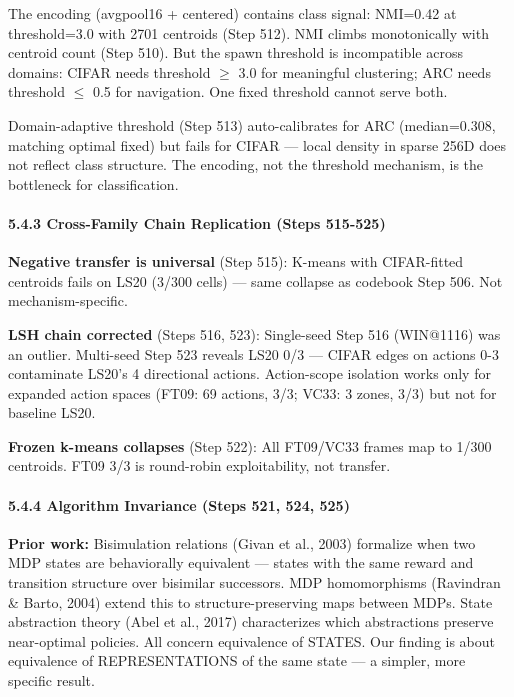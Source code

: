 \documentclass[
  11pt,
]{article}
\begin{document}
The encoding (avgpool16 + centered) contains class signal: NMI=0.42 at
threshold=3.0 with 2701 centroids (Step 512). NMI climbs monotonically
with centroid count (Step 510). But the spawn threshold is incompatible
across domains: CIFAR needs threshold \(\geq\) 3.0 for meaningful
clustering; ARC needs threshold \(\leq\) 0.5 for navigation. One fixed
threshold cannot serve both.

Domain-adaptive threshold (Step 513) auto-calibrates for ARC
(median=0.308, matching optimal fixed) but fails for CIFAR --- local
density in sparse 256D does not reflect class structure. The encoding,
not the threshold mechanism, is the bottleneck for classification.

\paragraph{5.4.3 Cross-Family Chain Replication (Steps
515-525)}\label{cross-family-chain-replication-steps-515-525}

\textbf{Negative transfer is universal} (Step 515): K-means with
CIFAR-fitted centroids fails on LS20 (3/300 cells) --- same collapse as
codebook Step 506. Not mechanism-specific.

\textbf{LSH chain corrected} (Steps 516, 523): Single-seed Step 516
(WIN@1116) was an outlier. Multi-seed Step 523 reveals LS20 0/3 ---
CIFAR edges on actions 0-3 contaminate LS20's 4 directional actions.
Action-scope isolation works only for expanded action spaces (FT09: 69
actions, 3/3; VC33: 3 zones, 3/3) but not for baseline LS20.

\textbf{Frozen k-means collapses} (Step 522): All FT09/VC33 frames map
to 1/300 centroids. FT09 3/3 is round-robin exploitability, not
transfer.

\paragraph{5.4.4 Algorithm Invariance (Steps 521, 524,
525)}\label{algorithm-invariance-steps-521-524-525}

\textbf{Prior work:} Bisimulation relations (Givan et al., 2003)
formalize when two MDP states are behaviorally equivalent --- states
with the same reward and transition structure over bisimilar successors.
MDP homomorphisms (Ravindran \& Barto, 2004) extend this to
structure-preserving maps between MDPs. State abstraction theory (Abel
et al., 2017) characterizes which abstractions preserve near-optimal
policies. All concern equivalence of STATES. Our finding is about
equivalence of REPRESENTATIONS of the same state --- a simpler, more
specific result.
\end{document}
